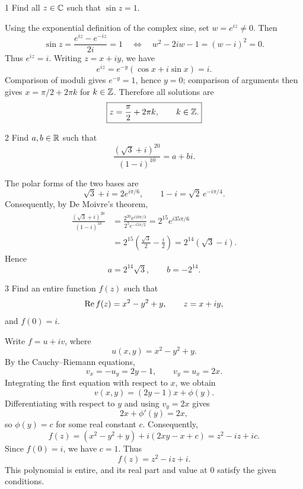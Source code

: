 \documentclass[11pt,oneside]{article}
\begin{document}

\begin{problem}{1}
Find all $z\in\mathbb{C}$ such that $\sin z=1$.
\end{problem}

\begin{solution}
Using the exponential definition of the complex sine, set $w=e^{iz}\ne0$. Then
\[
    \sin z=\frac{e^{iz}-e^{-iz}}{2i}=1
    \quad\Longleftrightarrow\quad
    w^2-2iw-1=(w-i)^2=0.
\]
Thus $e^{iz}=i$. Writing $z=x+iy$, we have
\[
    e^{iz}=e^{-y}(\cos x+i\sin x)=i.
\]
Comparison of moduli gives $e^{-y}=1$, hence $y=0$; comparison of arguments then gives $x=\pi/2+2\pi k$ for $k\in\mathbb{Z}$. Therefore all solutions are
\[
    \boxed{z=\frac{\pi}{2}+2\pi k, \qquad k\in\mathbb{Z}.}
\]
\end{solution}

\begin{problem}{2}
Find $a, b\in\mathbb{R}$ such that
\[
    \frac{(\sqrt3+i)^{20}}{(1-i)^{10}}=a+bi.
\]
\end{problem}

\begin{solution}
The polar forms of the two bases are
\[
    \sqrt3+i=2e^{i\pi/6},
    \qquad
    1-i=\sqrt2\,e^{-i\pi/4}.
\]
Consequently, by De Moivre's theorem,
\[
\begin{aligned}
    \frac{(\sqrt3+i)^{20}}{(1-i)^{10}}
    &=\frac{2^{20}e^{i10\pi/3}}{2^5e^{-i5\pi/2}}
      =2^{15}e^{i35\pi/6}\\
    &=2^{15}\left(\frac{\sqrt3}{2}-\frac{i}{2}\right)
      =2^{14}(\sqrt3-i).
\end{aligned}
\]
Hence
\[
    \boxed{a=2^{14}\sqrt3, \qquad b=-2^{14}.}
\]
\end{solution}

\begin{problem}{3}
Find an entire function $f(z)$ such that
\[
    \operatorname{Re} f(z)=x^2-y^2+y,
    \qquad z=x+iy,
\]
and $f(0)=i$.
\end{problem}

\begin{solution}[1]
Write $f=u+iv$, where
\[
    u(x, y)=x^2-y^2+y.
\]
By the Cauchy--Riemann equations,
\[
    v_x=-u_y=2y-1, \qquad v_y=u_x=2x.
\]
Integrating the first equation with respect to $x$, we obtain
\[
    v(x, y)=(2y-1)x+\phi(y).
\]
Differentiating with respect to $y$ and using $v_y=2x$ gives
\[
    2x+\phi'(y)=2x,
\]
so $\phi(y)=c$ for some real constant $c$. Consequently,
\[
    f(z)=(x^2-y^2+y)+i(2xy-x+c)
        =z^2-iz+ic.
\]
Since $f(0)=i$, we have $c=1$. Thus
\[
    \boxed{f(z)=z^2-iz+i.}
\]
This polynomial is entire, and its real part and value at $0$ satisfy the given conditions.
\end{solution}
\end{document}

